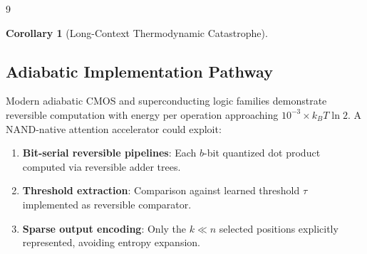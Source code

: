 \documentclass[11pt]{article}
\newtheorem{corollary}[theorem]{Corollary}
\theoremstyle{definition}
\begin{document}
\begin{thebibliography}{9}
{{{\begin{corollary}[Long-Context Thermodynamic Catastrophe]
\end{corollary}













\subsection{Adiabatic Implementation Pathway}













Modern adiabatic CMOS and superconducting logic families \cite{athas1994,likarev2007} demonstrate reversible computation with energy per operation approaching $10^{-3} \times k_B T \ln 2$. A NAND-native attention accelerator could exploit:













\begin{enumerate}






    \item \textbf{Bit-serial reversible pipelines}: Each $b$-bit quantized dot product computed via reversible adder trees.






    \item \textbf{Threshold extraction}: Comparison against learned threshold $\tau$ implemented as reversible comparator.






    \item \textbf{Sparse output encoding}: Only the $k \ll n$ selected positions explicitly represented, avoiding entropy expansion.






\end{enumerate}













}}}
\end{thebibliography}
\end{document}
